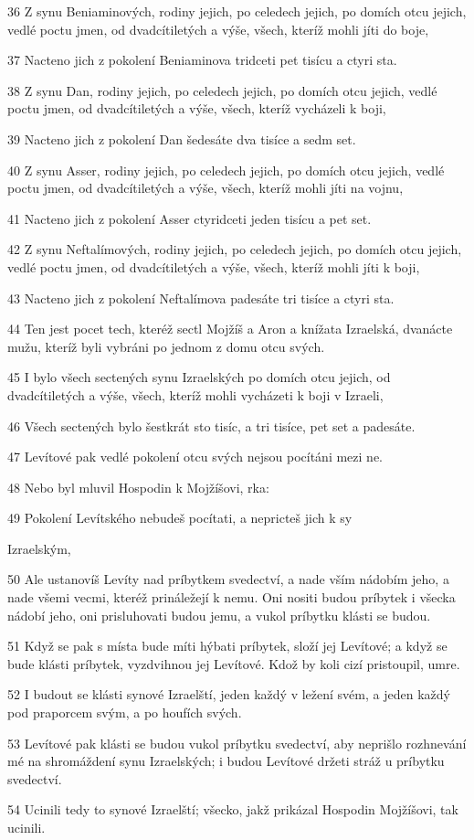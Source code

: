 \par 36 Z synu Beniaminových, rodiny jejich, po celedech jejich, po domích otcu jejich, vedlé poctu jmen, od dvadcítiletých a výše, všech, kteríž mohli jíti do boje,
\par 37 Nacteno jich z pokolení Beniaminova tridceti pet tisícu a ctyri sta.
\par 38 Z synu Dan, rodiny jejich, po celedech jejich, po domích otcu jejich, vedlé poctu jmen, od dvadcítiletých a výše, všech, kteríž vycházeli k boji,
\par 39 Nacteno jich z pokolení Dan šedesáte dva tisíce a sedm set.
\par 40 Z synu Asser, rodiny jejich, po celedech jejich, po domích otcu jejich, vedlé poctu jmen, od dvadcítiletých a výše, všech, kteríž mohli jíti na vojnu,
\par 41 Nacteno jich z pokolení Asser ctyridceti jeden tisícu a pet set.
\par 42 Z synu Neftalímových, rodiny jejich, po celedech jejich, po domích otcu jejich, vedlé poctu jmen, od dvadcítiletých a výše, všech, kteríž mohli jíti k boji,
\par 43 Nacteno jich z pokolení Neftalímova padesáte tri tisíce a ctyri sta.
\par 44 Ten jest pocet tech, kteréž sectl Mojžíš a Aron a knížata Izraelská, dvanácte mužu, kteríž byli vybráni po jednom z domu otcu svých.
\par 45 I bylo všech sectených synu Izraelských po domích otcu jejich, od dvadcítiletých a výše, všech, kteríž mohli vycházeti k boji v Izraeli,
\par 46 Všech sectených bylo šestkrát sto tisíc, a tri tisíce, pet set a padesáte.
\par 47 Levítové pak vedlé pokolení otcu svých nejsou pocítáni mezi ne.
\par 48 Nebo byl mluvil Hospodin k Mojžíšovi, rka:
\par 49 Pokolení Levítského nebudeš pocítati, a nepricteš jich k sy\par Izraelským,
\par 50 Ale ustanovíš Levíty nad príbytkem svedectví, a nade vším nádobím jeho, a nade všemi vecmi, kteréž prináležejí k nemu. Oni nositi budou príbytek i všecka nádobí jeho, oni prisluhovati budou jemu, a vukol príbytku klásti se budou.
\par 51 Když se pak s místa bude míti hýbati príbytek, složí jej Levítové; a když se bude klásti príbytek, vyzdvihnou jej Levítové. Kdož by koli cizí pristoupil, umre.
\par 52 I budout se klásti synové Izraelští, jeden každý v ležení svém, a jeden každý pod praporcem svým, a po houfích svých.
\par 53 Levítové pak klásti se budou vukol príbytku svedectví, aby neprišlo rozhnevání mé na shromáždení synu Izraelských; i budou Levítové držeti stráž u príbytku svedectví.
\par 54 Ucinili tedy to synové Izraelští; všecko, jakž prikázal Hospodin Mojžíšovi, tak ucinili.

